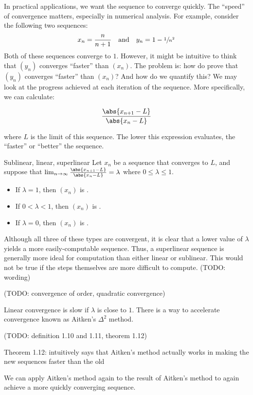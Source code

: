 In practical applications, we want the sequence to converge quickly. The ``speed'' of convergence matters, especially in numerical analysis. For example, consider the following two sequences:
\[ x_n = \frac{n}{n+1} \quad \text{and} \quad y_n = 1 - \sfrac{1}{n^2} \]
Both of these sequences converge to $1$. However, it might be intuitive to think that $(y_n)$ converges ``faster'' than $(x_n)$. The problem is: how do prove that $(y_n)$ converges ``faster'' than $(x_n)$? And how do we quantify this? We may look at the progress achieved at each iteration of the sequence. More specifically, we can calculate:

\[ \frac{\abs{x_{n+1} - L}}{\abs{x_n - L}} \]

where $L$ is the limit of this sequence. The lower this expression evaluates, the ``faster'' or ``better'' the sequence.

\begin{dfnbox}{Sublinear, linear, superlinear}{}
    Let $x_n$ be a sequence that converges to $L$, and suppose that $\lim_{n \to \infty} \frac{\abs{x_{n+1} - L}}{\abs{x_n - L}} = \lambda$ where $0 \leq \lambda \leq 1$.
    \begin{itemize}[noitemsep]
        \item If $\lambda = 1$, then $(x_n)$ is .
        \item If $0 < \lambda < 1$, then $(x_n)$ is .
        \item If $\lambda = 0$, then $(x_n)$ is .
    \end{itemize}
\end{dfnbox}

Although all three of these types are convergent, it is clear that a lower value of $\lambda$ yields a more easily-computable sequence. Thus, a superlinear sequence is generally more ideal for computation than either linear or sublinear. This would not be true if the steps themselves are more difficult to compute. (TODO: wording)

(TODO: convergence of order, quadratic convergence)

Linear convergence is slow if $\lambda$ is close to $1$. There is a way to accelerate convergence known as Aitken's $\Delta^2$ method.

(TODO: definition 1.10 and 1.11, theorem 1.12)

Theorem 1.12: intuitively says that Aitken's method actually works in making the new sequences faster than the old

We can apply Aitken's method again to the result of Aitken's method to again achieve a more quickly converging sequence.

